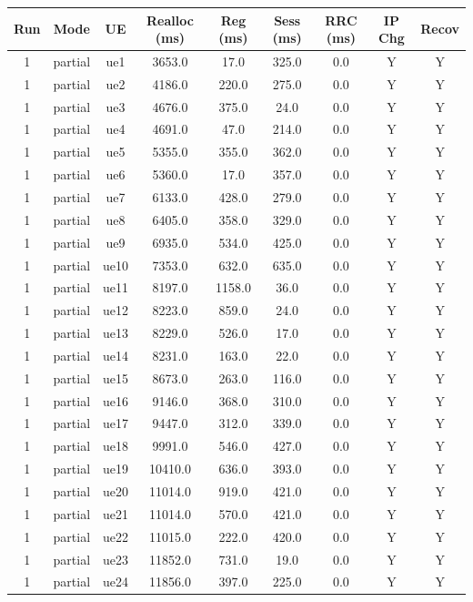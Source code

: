 \begin{table}[ht]
\centering
\begin{tabular}{|c|c|c|c|c|c|c|c|c|}
\hline
Run & Mode & UE & Realloc (ms) & Reg (ms) & Sess (ms) & RRC (ms) & IP Chg & Recov \\
\hline
1 & partial & ue1 & 3653.0 & 17.0 & 325.0 & 0.0 & Y & Y \\
1 & partial & ue2 & 4186.0 & 220.0 & 275.0 & 0.0 & Y & Y \\
1 & partial & ue3 & 4676.0 & 375.0 & 24.0 & 0.0 & Y & Y \\
1 & partial & ue4 & 4691.0 & 47.0 & 214.0 & 0.0 & Y & Y \\
1 & partial & ue5 & 5355.0 & 355.0 & 362.0 & 0.0 & Y & Y \\
1 & partial & ue6 & 5360.0 & 17.0 & 357.0 & 0.0 & Y & Y \\
1 & partial & ue7 & 6133.0 & 428.0 & 279.0 & 0.0 & Y & Y \\
1 & partial & ue8 & 6405.0 & 358.0 & 329.0 & 0.0 & Y & Y \\
1 & partial & ue9 & 6935.0 & 534.0 & 425.0 & 0.0 & Y & Y \\
1 & partial & ue10 & 7353.0 & 632.0 & 635.0 & 0.0 & Y & Y \\
1 & partial & ue11 & 8197.0 & 1158.0 & 36.0 & 0.0 & Y & Y \\
1 & partial & ue12 & 8223.0 & 859.0 & 24.0 & 0.0 & Y & Y \\
1 & partial & ue13 & 8229.0 & 526.0 & 17.0 & 0.0 & Y & Y \\
1 & partial & ue14 & 8231.0 & 163.0 & 22.0 & 0.0 & Y & Y \\
1 & partial & ue15 & 8673.0 & 263.0 & 116.0 & 0.0 & Y & Y \\
1 & partial & ue16 & 9146.0 & 368.0 & 310.0 & 0.0 & Y & Y \\
1 & partial & ue17 & 9447.0 & 312.0 & 339.0 & 0.0 & Y & Y \\
1 & partial & ue18 & 9991.0 & 546.0 & 427.0 & 0.0 & Y & Y \\
1 & partial & ue19 & 10410.0 & 636.0 & 393.0 & 0.0 & Y & Y \\
1 & partial & ue20 & 11014.0 & 919.0 & 421.0 & 0.0 & Y & Y \\
1 & partial & ue21 & 11014.0 & 570.0 & 421.0 & 0.0 & Y & Y \\
1 & partial & ue22 & 11015.0 & 222.0 & 420.0 & 0.0 & Y & Y \\
1 & partial & ue23 & 11852.0 & 731.0 & 19.0 & 0.0 & Y & Y \\
1 & partial & ue24 & 11856.0 & 397.0 & 225.0 & 0.0 & Y & Y \\

\end{tabular}
\end{table}
